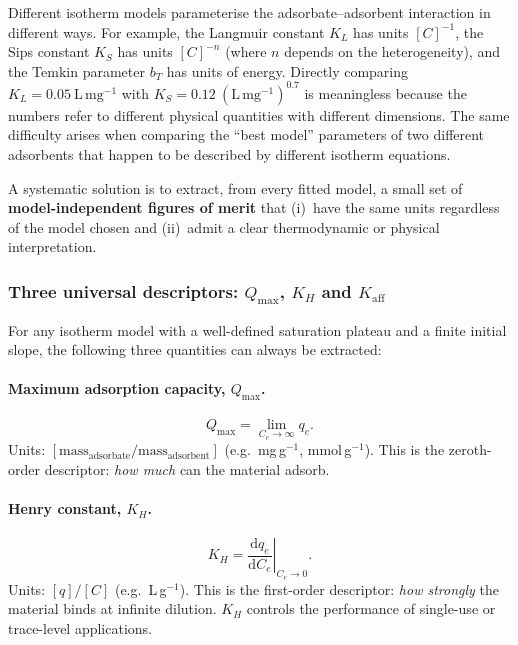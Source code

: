 \documentclass[12pt]{article}
\begin{document}
	Different isotherm models parameterise the adsorbate--adsorbent
	interaction in different ways.  For example, the Langmuir constant
	$K_L$ has units $[C]^{-1}$, the Sips constant $K_S$ has units
	$[C]^{-n}$ (where $n$ depends on the heterogeneity), and the Temkin
	parameter $b_T$ has units of energy.
	Directly comparing $K_L = 0.05~\mathrm{L\,mg^{-1}}$ with
	$K_S = 0.12~\mathrm{(L\,mg^{-1})^{0.7}}$ is meaningless because
	the numbers refer to different physical quantities with different
	dimensions.  The same difficulty arises when comparing the ``best
	model'' parameters of two different adsorbents that happen to be
	described by different isotherm equations.

	A systematic solution is to extract, from every fitted model, a
	small set of \textbf{model-independent figures of merit} that
	(i)~have the same units regardless of the model chosen and
	(ii)~admit a clear thermodynamic or physical interpretation.

	\subsubsection{Three universal descriptors: $Q_{\max}$, $K_H$ and $K_{\mathrm{aff}}$}

	For any isotherm model with a well-defined saturation plateau and
	a finite initial slope, the following three quantities can always
	be extracted:

	\paragraph{Maximum adsorption capacity, $Q_{\max}$.}
	\begin{equation}
		Q_{\max} = \lim_{C_e \to \infty} q_e.
		\label{eq:Qmax_universal}
	\end{equation}
	Units: $[\text{mass}_{\text{adsorbate}} / \text{mass}_{\text{adsorbent}}]$
	(e.g.\ mg\,g$^{-1}$, mmol\,g$^{-1}$).
	This is the zeroth-order descriptor: \emph{how much} can the
	material adsorb.

	\paragraph{Henry constant, $K_H$.}
	\begin{equation}
		K_H = \left.\frac{\mathrm{d}q_e}{\mathrm{d}C_e}
		\right|_{C_e \to 0}.
		\label{eq:KH_universal}
	\end{equation}
	Units: $[q]/[C]$ (e.g.\ L\,g$^{-1}$).
	This is the first-order descriptor: \emph{how strongly} the
	material binds at infinite dilution.  $K_H$ controls the
	performance of single-use or trace-level applications.
\end{document}
